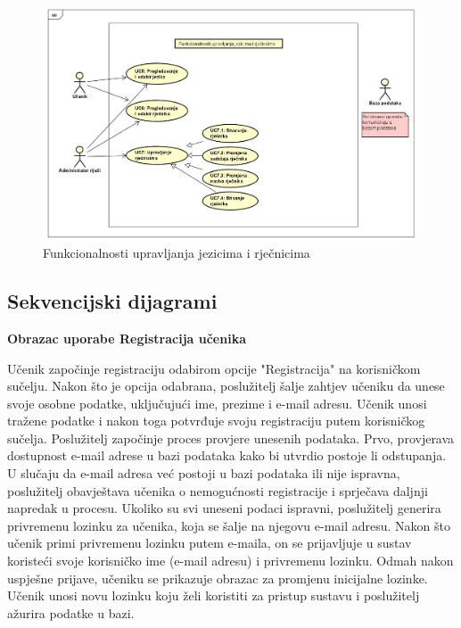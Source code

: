\begin{figure}[H]
	\includegraphics[scale=0.34]{dijagrami/dijagram3.jpg} 
	\centering
	\caption{Funkcionalnosti upravljanja jezicima i rječnicima}
	\label{fig:dijagram3}
\end{figure}	

\subsection{Sekvencijski dijagrami}

\textbf{{Obrazac uporabe Registracija učenika}}\


Učenik započinje registraciju odabirom opcije "Registracija" na korisničkom sučelju. Nakon što je opcija odabrana, poslužitelj šalje zahtjev učeniku da unese svoje osobne podatke, uključujući ime, prezime i e-mail adresu. Učenik unosi tražene podatke i nakon toga potvrđuje svoju registraciju putem korisničkog sučelja. Poslužitelj započinje proces provjere unesenih podataka. Prvo, provjerava dostupnost e-mail adrese u bazi podataka kako bi utvrdio postoje li odstupanja. U slučaju da e-mail adresa već postoji u bazi podataka ili nije ispravna, poslužitelj obavještava učenika o nemogućnosti registracije i sprječava daljnji napredak u procesu. Ukoliko su svi uneseni podaci ispravni, poslužitelj generira privremenu lozinku za učenika, koja se šalje na njegovu e-mail adresu. Nakon što učenik primi privremenu lozinku putem e-maila, on se prijavljuje u sustav koristeći svoje korisničko ime (e-mail adresu) i privremenu lozinku. Odmah nakon uspješne prijave, učeniku se prikazuje obrazac za promjenu inicijalne lozinke. Učenik unosi novu lozinku koju želi koristiti za pristup sustavu i poslužitelj ažurira podatke u bazi.

